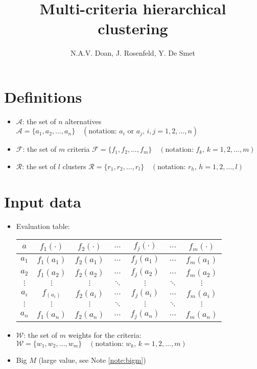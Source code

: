 \documentclass[a4paper]{article}
\title{Multi-criteria hierarchical clustering}
\author{N.A.V. Doan, J. Rosenfeld, Y. De Smet}
\date{}
\begin{document}
    \maketitle
    \section{Definitions}
    \begin{itemize}
        \item $\mathcal{A}$: the set of $n$ alternatives $\mathcal{A} = \{a_1, a_2, \dots, a_n\} \quad (\text{notation: } a_i \text{ or } a_j,\, i,j = 1, 2, \dots, n)$
        \item $\mathcal{F}$: the set of $m$ criteria $\mathcal{F} = \{f_1, f_2, \dots, f_m\} \quad (\text{notation: } f_k,\, k = 1, 2, \dots, m)$
        \item $\mathcal{R}$: the set of $l$ clusters $\mathcal{R} = \{r_1, r_2, \dots, r_l\} \quad (\text{notation: } r_h,\, h = 1, 2, \dots, l)$
    \end{itemize}
    \section{Input data}
    \begin{itemize}
        \item Evaluation table: \begin{tabular}{c|cccccc}
            $a$ & $f_1(\cdot)$ & $f_2(\cdot)$ & $\dots$ & $f_j(\cdot)$ & $\dots$ & $f_m(\cdot)$\\
            \hline
            $a_1$ & $f_1(a_1)$ & $f_2(a_1)$ & $\dots$ & $f_j(a_1)$ & $\dots$ & $f_m(a_1)$\\
            $a_2$ & $f_1(a_2)$ & $f_2(a_2)$ & $\dots$ & $f_j(a_2)$ & $\dots$ & $f_m(a_2)$\\
            $\vdots$ & $\vdots$ & $\vdots$ & $\ddots$ & $\vdots$ & $\ddots$ & $\vdots$\\
            $a_i$ & $f_(a_i)$ & $f_2(a_i)$ & $\dots$ & $f_j(a_i)$ & $\dots$ & $f_m(a_i)$\\
            $\vdots$ & $\vdots$ & $\vdots$ & $\ddots$ & $\vdots$ & $\ddots$ & $\vdots$\\
            $a_n$ & $f_1(a_n)$ & $f_2(a_n)$ & $\dots$ & $f_j(a_n)$ & $\dots$ & $f_m(a_n)$\\
        \end{tabular}
        \item $\mathcal{W}$: the set of $m$ weights for the criteria: $\mathcal{W} = \{w_1, w_2, \dots, w_m\} \quad (\text{notation: } w_k,\, k = 1, 2, \dots, m)$
        \item Big $M$ (large value, see Note \ref{note:bigm})
    \end{itemize}
\end{document}
